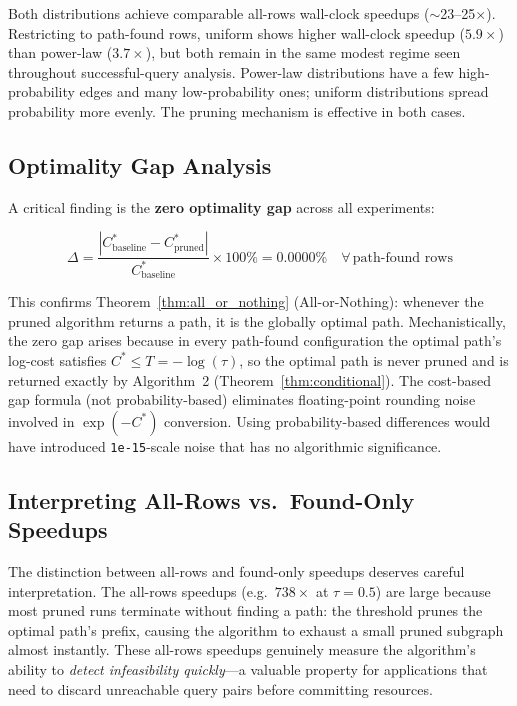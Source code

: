 Both distributions achieve comparable all-rows wall-clock speedups ($\sim$23--25$\times$). Restricting to path-found rows, uniform shows higher wall-clock speedup ($5.9\times$) than power-law ($3.7\times$), but both remain in the same modest regime seen throughout successful-query analysis. Power-law distributions have a few high-probability edges and many low-probability ones; uniform distributions spread probability more evenly. The pruning mechanism is effective in both cases.

\subsection{Optimality Gap Analysis}

A critical finding is the \textbf{zero optimality gap} across all experiments:

\[
\Delta = \frac{|C^*_{\text{baseline}} - C^*_{\text{pruned}}|}{C^*_{\text{baseline}}} \times 100\% = 0.0000\% \quad \forall\, \text{path-found rows}
\]

This confirms Theorem~\ref{thm:all_or_nothing} (All-or-Nothing): whenever the pruned algorithm returns a path, it is the globally optimal path. Mechanistically, the zero gap arises because in every path-found configuration the optimal path's log-cost satisfies $C^* \leq T = -\log(\tau)$, so the optimal path is never pruned and is returned exactly by Algorithm~2 (Theorem~\ref{thm:conditional}). The cost-based gap formula (not probability-based) eliminates floating-point rounding noise involved in $\exp(-C^*)$ conversion. Using probability-based differences would have introduced \texttt{1e-15}-scale noise that has no algorithmic significance.

\subsection{Interpreting All-Rows vs.\ Found-Only Speedups}\label{sec:found_only_analysis}

The distinction between all-rows and found-only speedups deserves careful interpretation. The all-rows speedups (e.g.\ $738\times$ at $\tau=0.5$) are large because most pruned runs terminate without finding a path: the threshold prunes the optimal path's prefix, causing the algorithm to exhaust a small pruned subgraph almost instantly. These all-rows speedups genuinely measure the algorithm's ability to \emph{detect infeasibility quickly}---a valuable property for applications that need to discard unreachable query pairs before committing resources.


